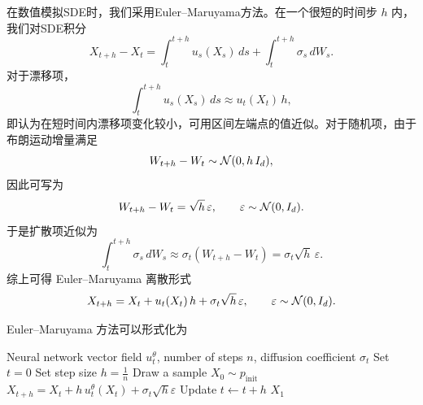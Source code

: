 在数值模拟SDE时，我们采用Euler--Maruyama方法。在一个很短的时间步 $h$ 内，我们对SDE积分
\begin{equation}
  X_{t+h} - X_t
  =
  \int_t^{t+h} u_s(X_s)\,ds
  +
  \int_t^{t+h} \sigma_s\,dW_s.
\end{equation}
对于漂移项，
\begin{equation}
    \int_t^{t+h} u_s(X_s)\,ds
    \approx
    u_t(X_t)\,h,
\end{equation}
即认为在短时间内漂移项变化较小，可用区间左端点的值近似。对于随机项，由于布朗运动增量满足
\begin{equation}
    W_{t+h} - W_t
    \sim
    \mathcal{N}(0, h\,I_d),
\end{equation}
因此可写为
\begin{equation}
    W_{t+h} - W_t
    =
    \sqrt{h}\,\varepsilon,
    \qquad
    \varepsilon \sim \mathcal{N}(0, I_d).
\end{equation}
于是扩散项近似为
\begin{equation}
    \int_t^{t+h} \sigma_s\,dW_s
    \approx
    \sigma_t (W_{t+h} - W_t)
    =
    \sigma_t \sqrt{h}\,\varepsilon.
\end{equation}
综上可得 Euler--Maruyama 离散形式
\begin{equation}
X_{t+h} = X_t + u_t(X_t)\, h + \sigma_t\sqrt{h}\,\varepsilon,
\qquad \varepsilon \sim \mathcal{N}(0,I_d).
\end{equation}

Euler--Maruyama 方法可以形式化为
\begin{algorithm}
  \caption{Sampling from a Diffusion Model with Euler--Maruyama method}
  \begin{algorithmic}[1]
  \Require Neural network vector field $u_t^\theta$, number of steps $n$, diffusion coefficient $\sigma_t$
  \State Set $t = 0$
  \State Set step size $h = \frac{1}{n}$
  \State Draw a sample $X_0 \sim p_{\mathrm{init}}$
      \State $X_{t+h} = X_t + h\, u_t^\theta(X_t) + \sigma_t \sqrt{h} \varepsilon$
      \State Update $t \leftarrow t + h$
  \EndFor
  \State \Return $X_1$
  \end{algorithmic}
  \end{algorithm}


